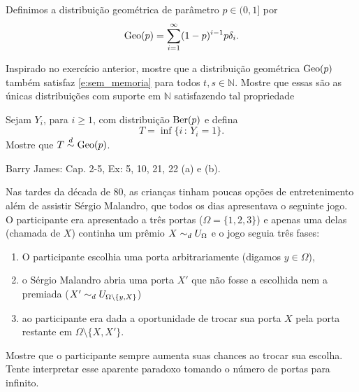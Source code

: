 \begin{topics}
Definimos a distribuição geométrica  de parâmetro $p \in (0,1]$ por
\begin{equation}
  \operatorname{Geo}(p) = \sum_{i = 1}^\infty (1-p)^{i-1} p \delta_i.
\end{equation}

\begin{exercise}
  Inspirado no exercício anterior, mostre que a distribuição geométrica $\operatorname{Geo}(p)$ também satisfaz \eqref{e:sem_memoria} para todos $t, s \in \mathbb{N}$.
  Mostre que essas são as únicas distribuições com suporte em $\mathbb{N}$ satisfazendo tal propriedade
\end{exercise}

\begin{exercise}
  \label{x:geo_time}
  Sejam $Y_i$, para $i \geq 1$, \iid com distribuição $\operatorname{Ber}(p)$ e defina
  \begin{equation}
    T = \inf\{i\, : \, Y_i = 1\}.
  \end{equation}
  Mostre que $T \overset{d}\sim \operatorname{Geo}(p)$.
\end{exercise}

\begin{exercise}
  Barry James: Cap. 2-5, Ex: 5, 10, 21, 22 (a) e (b).
\end{exercise}

\begin{exercise}
  Nas tardes da década de 80, as crianças tinham poucas opções de entretenimento além de assistir Sérgio Malandro, que todos os dias apresentava o seguinte jogo.
  O participante era apresentado a três portas ($\Omega = \{1,2,3\}$) e apenas uma delas (chamada de $X$) continha um prêmio $X \sim_d U_{\Omega}$ e o jogo seguia três fases:
  \begin{enumerate}[\quad a)]
  \item O participante escolhia uma porta arbitrariamente (digamos $y \in \Omega$),
  \item o Sérgio Malandro abria uma porta $X'$ que não fosse a escolhida nem a premiada ($X' \sim_d U_{\Omega \setminus \{y, X\}}$)
  \item ao participante era dada a oportunidade de trocar sua porta $X$ pela porta restante em $\Omega \setminus \{X, X'\}$.
  \end{enumerate}
  Mostre que o participante sempre aumenta suas chances ao trocar sua escolha.
  Tente interpretar esse aparente paradoxo tomando o número de portas para infinito.
\end{exercise}


\end{topics}
